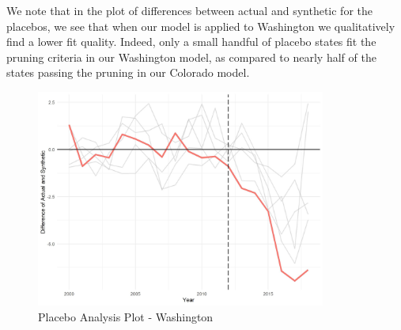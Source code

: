 \documentclass{article}
\begin{document}
We note that in the plot of differences between actual and synthetic for the placebos, we see that when our model is applied to Washington we qualitatively find a lower fit quality. Indeed, only a small handful of placebo states fit the pruning criteria in our Washington model, as compared to nearly half of the states  passing the pruning in our Colorado model.

\begin{figure}[H]
	\begin{center}
		\includegraphics[width=0.85\textwidth]{placebos_plot_washington}
	\end{center}
	\caption{Placebo Analysis Plot - Washington}
	\label{fig:placebos_plot_washington}
\end{figure}
\newpage


\end{document}
